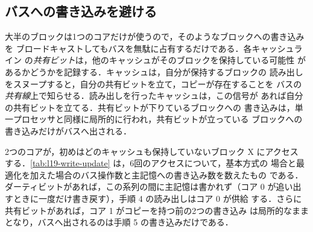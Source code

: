 \documentclass[../main.tex]{subfiles}
\begin{document}
\subsection{バスへの書き込みを避ける}

大半のブロックは1つのコアだけが使うので，そのようなブロックへの書き込みを
ブロードキャストしてもバスを無駄に占有するだけである．各キャッシュライン
の\emph{共有ビット}は，他のキャッシュがそのブロックを保持している可能性
があるかどうかを記録する．キャッシュは，自分が保持するブロックの
読み出しをスヌープすると，自分の共有ビットを立て，コピーが存在することを
バスの\emph{共有線}上で知らせる．読み出しを行ったキャッシュは，この信号が
あれば自分の共有ビットを立てる．共有ビットが下りているブロックへの
書き込みは，単一プロセッサと同様に局所的に行われ，共有ビットが立っている
ブロックへの書き込みだけがバスへ出される．

\begin{example}
  \label{ex:l19-write-update}
  2つのコアが，初めはどのキャッシュも保持していないブロック X にアクセス
  する．\cref{tab:l19-write-update} は，6回のアクセスについて，基本方式の
  場合と最適化を加えた場合のバス操作数と主記憶への書き込み数を数えたもの
  である．ダーティビットがあれば，この系列の間に主記憶は書かれず（コア 0
  が追い出すときに一度だけ書き戻す），手順 4 の読み出しはコア 0 が供給
  する．さらに共有ビットがあれば，コア 1 がコピーを持つ前の2つの書き込み
  は局所的なままとなり，バスへ出されるのは手順 5 の書き込みだけである．
\end{example}
\end{document}
